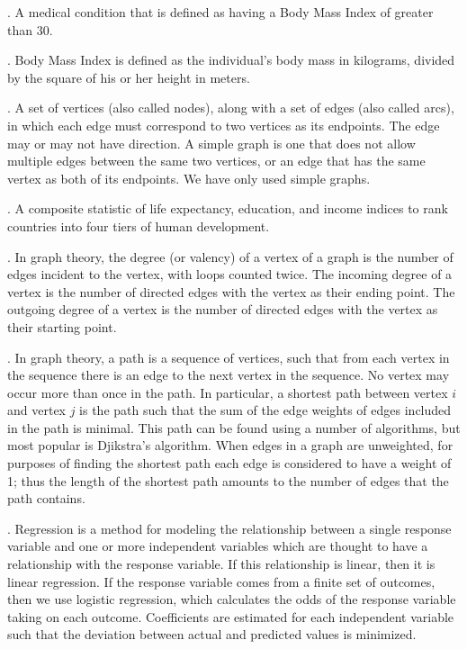 \documentclass[oneside,12pt]{report}
\begin{document}
\vspace{12pt}

\vspace{8pt}
. A medical condition that is defined as having a Body Mass Index of greater than 30.

\vspace{8pt}
. Body Mass Index is defined as the individual's body mass in kilograms, divided by the square of his or her height in meters.

\vspace{8pt}
. A set of vertices (also called nodes), along with a set of edges (also called arcs), in which each edge must correspond to two vertices as its endpoints. The edge may or may not have direction. A simple graph is one that does not allow multiple edges between the same two vertices, or an edge that has the same vertex as both of its endpoints. We have only used simple graphs.

\vspace{8pt}
. A composite statistic of life expectancy, education, and income indices to rank countries into four tiers of human development.

\vspace{8pt} . In graph theory, the degree (or valency) of a vertex of a graph is the number of edges incident to the vertex, with loops counted twice. The incoming degree of a vertex is the number of directed edges with the vertex as their ending point. The outgoing degree of a vertex is the number of directed edges with the vertex as their starting point.

\vspace{8pt} . In graph theory, a path is a sequence of vertices, such that from each vertex in the sequence there is an edge to the next vertex in the sequence. No vertex may occur more than once in the path. In particular, a shortest path between vertex $i$ and vertex $j$ is the path such that the sum of the edge weights of edges included in the path is minimal. This path can be found using a number of algorithms, but most popular is Djikstra's algorithm. When edges in a graph are unweighted, for purposes of finding the shortest path each edge is considered to have a weight of 1; thus the length of the shortest path amounts to the number of edges that the path contains.

\vspace{8pt} . Regression is a method for modeling the relationship between a single response variable and one or more independent variables which are thought to have a relationship with the response variable. If this relationship is linear, then it is linear regression. If the response variable comes from a finite set of outcomes, then we use logistic regression, which calculates the odds of the response variable taking on each outcome. Coefficients are estimated for each independent variable such that the deviation between actual and predicted values is minimized.
\end{document}
